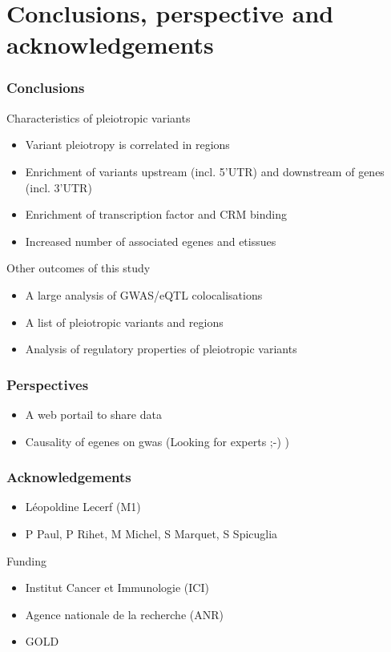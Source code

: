 \documentclass{beamer}
\begin{document}
\section{Conclusions, perspective and acknowledgements} %

\begin{frame}
\frametitle{Conclusions}

Characteristics of pleiotropic variants
%
\begin{itemize}
\item Variant pleiotropy is correlated in regions
\item Enrichment of variants upstream (incl. 5'UTR) and downstream of genes (incl. 3'UTR)
\item Enrichment of transcription factor and CRM binding
\item Increased number of associated egenes and etissues
\end{itemize}
%
\vfill
%
Other outcomes of this study
%
\begin{itemize}
\item A large analysis of GWAS/eQTL colocalisations
\item A list of pleiotropic variants and regions
\item Analysis of regulatory properties of pleiotropic variants
\end{itemize}

\end{frame}

\begin{frame}
\frametitle{Perspectives}


\begin{itemize}
\item A web portail to share data
\item Causality of egenes on gwas (Looking for experts ;-) )
\end{itemize}

\end{frame}

\begin{frame}
\frametitle{Acknowledgements}

\begin{itemize}
\item L\'eopoldine Lecerf (M1)
\item P Paul, P Rihet, M Michel, S Marquet, S Spicuglia
\end{itemize}
%
\vfill
%
Funding
%
\begin{itemize}
\item Institut Cancer et Immunologie (ICI)
\item Agence nationale de la recherche (ANR)
\item GOLD
\end{itemize}

\end{frame}
\end{document}
